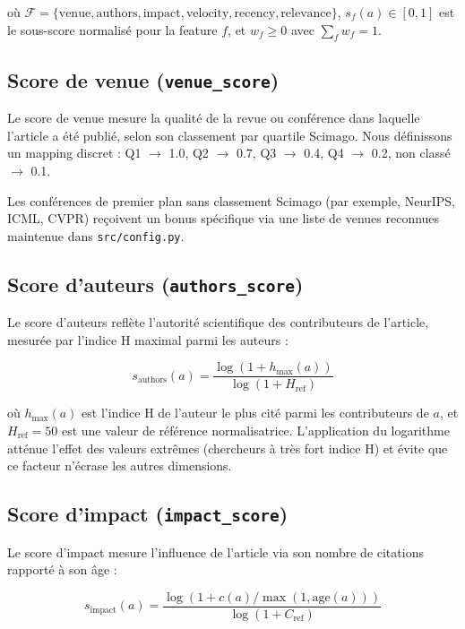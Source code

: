où $\mathcal{F} = \{\text{venue}, \text{authors}, \text{impact},
\text{velocity}, \text{recency}, \text{relevance}\}$,
$s_f(a) \in [0, 1]$ est le sous-score normalisé pour la feature $f$,
et $w_f \geq 0$ avec $\sum_f w_f = 1$.

\subsection{Score de venue (\texttt{venue\_score})}

Le score de venue mesure la qualité de la revue ou conférence dans laquelle
l'article a été publié, selon son classement par quartile Scimago.
Nous définissons un mapping discret : Q1 $\to$ 1.0, Q2 $\to$ 0.7,
Q3 $\to$ 0.4, Q4 $\to$ 0.2, non classé $\to$ 0.1.

Les conférences de premier plan sans classement Scimago (par exemple,
NeurIPS, ICML, CVPR) reçoivent un bonus spécifique via une liste
de venues reconnues maintenue dans \texttt{src/config.py}.

\subsection{Score d'auteurs (\texttt{authors\_score})}

Le score d'auteurs reflète l'autorité scientifique des contributeurs
de l'article, mesurée par l'indice H maximal parmi les auteurs :

\begin{equation}
  s_{\text{authors}}(a) = \frac{\log(1 + h_{\max}(a))}{\log(1 + H_{\text{ref}})}
  \label{eq:authors_score}
\end{equation}

où $h_{\max}(a)$ est l'indice H de l'auteur le plus cité parmi les
contributeurs de $a$, et $H_{\text{ref}} = 50$ est une valeur de référence
normalisatrice. L'application du logarithme atténue l'effet des valeurs
extrêmes (chercheurs à très fort indice H) et évite que ce facteur
n'écrase les autres dimensions.

\subsection{Score d'impact (\texttt{impact\_score})}

Le score d'impact mesure l'influence de l'article via son nombre de
citations rapporté à son âge :

\begin{equation}
  s_{\text{impact}}(a) = \frac{\log(1 + c(a)/\max(1, \text{age}(a)))}
    {\log(1 + C_{\text{ref}})}
  \label{eq:impact_score}
\end{equation}


